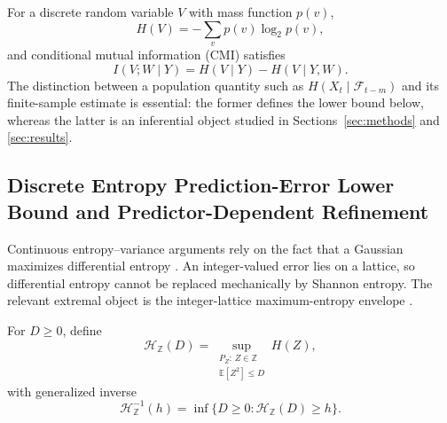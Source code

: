 For a discrete random variable \(V\) with mass function \(p(v)\),
\begin{equation}
H(V)=-\sum_vp(v)\log_2p(v),
\label{eq:shannon_entropy}
\end{equation}
and conditional mutual information (CMI) satisfies
\begin{equation}
I(V;W\mid Y)=H(V\mid Y)-H(V\mid Y,W).
\label{eq:cmi_definition}
\end{equation}
The distinction between a population quantity such as
\(H(X_t\mid\mathcal F_{t-m})\) and its finite-sample estimate is essential:
the former defines the lower bound below, whereas the latter is an inferential
object studied in Sections~\ref{sec:methods} and \ref{sec:results}.

\subsection{Discrete Entropy Prediction-Error Lower Bound and Predictor-Dependent Refinement}
\label{subsec:discrete_bound}

Continuous entropy--variance arguments rely on the fact that a Gaussian
maximizes differential entropy \citep{fang_variance_bounds}. An
integer-valued error lies on a lattice, so differential entropy cannot be
replaced mechanically by Shannon entropy. The relevant extremal object is
the integer-lattice maximum-entropy envelope
\citep{massey_integer_entropy}.

\begin{Definition}
\label{def:integer_entropy_envelope}
For \(D\geq0\), define
\begin{equation}
\mathcal H_{\mathbb Z}(D)
=
\sup_{\substack{P_Z:\,Z\in\mathbb Z\\\mathbb E[Z^2]\leq D}}H(Z),
\label{eq:integer_entropy_envelope}
\end{equation}
with generalized inverse
\begin{equation}
\mathcal H_{\mathbb Z}^{-1}(h)
=
\inf\{D\geq0:\mathcal H_{\mathbb Z}(D)\geq h\}.
\label{eq:integer_entropy_inverse}
\end{equation}
\end{Definition}

